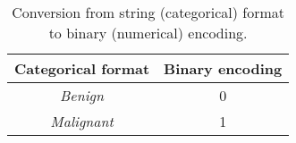 \begin{table}[h]
\centering
\begin{tabular}{|c|c|}
\hline
\textbf{Categorical format} & \textbf{Binary encoding} \\ \hline
\textit{Benign}             & 0                        \\ \hline
\textit{Malignant}          & 1                        \\ \hline
\end{tabular}
\caption{Conversion from string (categorical) format to binary (numerical) encoding.}
\label{tab:binary-encoding-example}
\end{table}